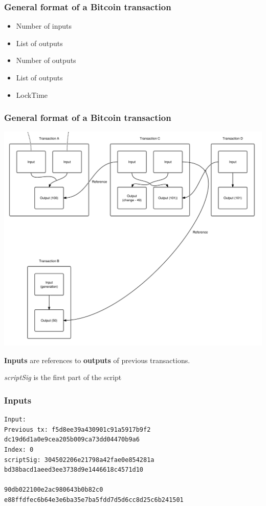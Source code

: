 \documentclass{beamer}
\begin{document}
\begin{frame}
\frametitle{General format of a Bitcoin transaction}
\begin{itemize}
\item Number of inputs
\item List of outputs
\item Number of outputs
\item List of outputs
\item LockTime
\end{itemize}
\end{frame}
\begin{frame}
\frametitle{General format of a Bitcoin transaction}
\includegraphics[scale=0.2]{images/transactions.png}
\end{frame}

\begin{frame}[fragile]
\textbf{Inputs} are references to \textbf{outputs} of previous transactions.

\textit{scriptSig} is the first part of the script
\frametitle{Inputs}
\begin{verbatim}Input:
Previous tx: f5d8ee39a430901c91a5917b9f2
dc19d6d1a0e9cea205b009ca73dd04470b9a6
Index: 0
scriptSig: 304502206e21798a42fae0e854281a
bd38bacd1aeed3ee3738d9e1446618c4571d10

90db022100e2ac980643b0b82c0
e88ffdfec6b64e3e6ba35e7ba5fdd7d5d6cc8d25c6b241501
\end{verbatim}
\end{frame}
\end{document}
